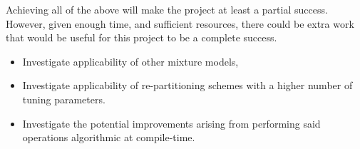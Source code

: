 \documentclass[11pt, reprint]{revtex4-2}
\begin{document}
Achieving all of the above will make the project at least a partial
success. However, given enough time, and sufficient resources, there
could be extra work that would be useful for this project to be a
complete success.

\goodbreak%
\begin{itemize}
\item Investigate applicability of other mixture models,\cite{Higson2018DynamicNS}
\item Investigate applicability of re-partitioning schemes with a higher
  number of tuning parameters.
\item Investigate the potential improvements arising from performing
  said operations algorithmic at compile-time.
\end{itemize}

\end{document}
